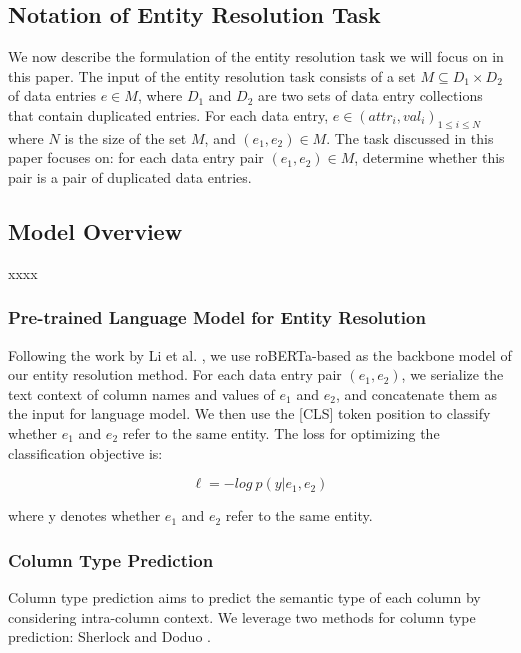 \subsection{Notation of Entity Resolution Task}
We now describe the formulation of the entity resolution task we will focus on in this paper. The input of the entity resolution task consists of a set $M \subseteq D_1 \times D_2$ of data entries $e \in M$, where $D_1$ and $D_2$ are two sets of data entry collections that contain duplicated entries. 
For each data entry, $e \in {(attr_i, val_i)}_{1 \leq i \leq N}$ where $N$ is the size of the set $M$, and $(e_1, e_2) \in M$. The task discussed in this paper focuses on: for each data entry pair $(e_1, e_2) \in M$, determine whether this pair is a pair of duplicated data entries.

\subsection{Model Overview}
xxxx

\subsubsection{Pre-trained Language Model for Entity Resolution}
Following the work by Li et al. \cite{li_deep_2020}, we use roBERTa-based as the backbone model of our entity resolution method. For each data entry pair $(e_1, e_2)$, we serialize the text context of column names and values of $e_1$ and $e_2$, and concatenate them as the input for language model. We then use the [CLS] token position to classify whether $e_1$ and $e_2$ refer to the same entity. 
The loss for optimizing the classification objective is:

\begin{equation}
    \ell = - log\ p(y | e_1, e_2)
\end{equation}

where y denotes whether $e_1$ and $e_2$ refer to the same entity. 



\subsubsection{Column Type Prediction}
Column type prediction aims to predict the semantic type of each column by considering intra-column context. We leverage two methods for column type prediction: Sherlock \cite{hulsebos_sherlock_2019} and Doduo \cite{suhara_annotating_2022}.


